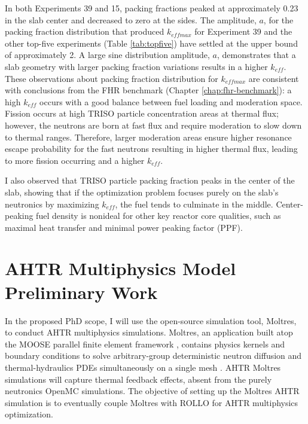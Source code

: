 In both Experiments 39 and 15, packing fractions peaked at approximately 
0.23 in the slab center and decreased to zero at the sides.  
The amplitude, $a$, for the packing fraction distribution that produced $k_{eff max}$ 
for Experiment 39 and the other top-five experiments (Table \ref{tab:topfive}) 
have settled at the upper bound of approximately 2. 
A large sine distribution amplitude, $a$, demonstrates that a slab geometry 
with larger packing fraction variations results in a higher $k_{eff}$. 
These observations about packing fraction distribution for $k_{eff max}$ are 
consistent with conclusions from the \gls{FHR} benchmark (Chapter 
\ref{chap:fhr-benchmark}): a high $k_{eff}$ occurs with a good balance between 
fuel loading and moderation space. 
Fission occurs at high \gls{TRISO} particle concentration areas at thermal flux;
however, the neutrons are born at fast flux and require moderation to slow down 
to thermal ranges.
Therefore, larger moderation areas ensure higher resonance escape probability for 
the fast neutrons resulting in higher thermal flux, leading to more 
fission occurring and a higher $k_{eff}$. 

I also observed that \gls{TRISO} particle packing fraction peaks in the center 
of the slab, showing that if the optimization problem focuses purely on the 
slab's neutronics by maximizing $k_{eff}$, the fuel tends to culminate in the 
middle. 
Center-peaking fuel density is nonideal for other key reactor core 
qualities, such as maximal heat transfer and minimal power peaking factor (PPF).

\section{AHTR Multiphysics Model Preliminary Work}
\label{sec:multiphysics_homo}
In the proposed PhD scope, I will use the open-source simulation tool, Moltres, 
to conduct \gls{AHTR} multiphysics simulations. 
Moltres, an application built atop the \gls{MOOSE} parallel finite element 
framework \cite{gaston_moose:_2009}, contains physics kernels and boundary 
conditions to solve arbitrary-group deterministic neutron diffusion and 
thermal-hydraulics \glspl{PDE} simultaneously on a single mesh
\cite{lindsay_introduction_2018,park_advancement_2020}. 
\gls{AHTR} Moltres simulations will capture thermal feedback effects, absent
from the purely neutronics OpenMC simulations.  
The objective of setting up the Moltres \gls{AHTR} simulation is to eventually 
couple Moltres with \gls{ROLLO} for \gls{AHTR} multiphysics optimization. 

